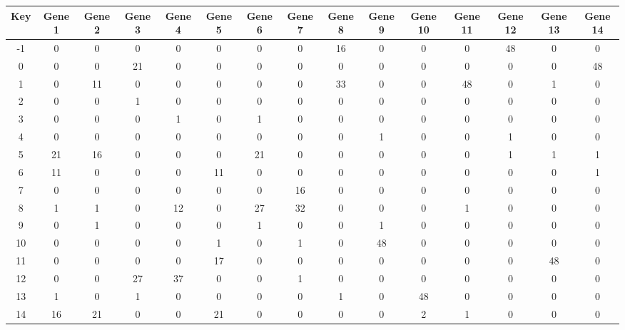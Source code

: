 \begin{tabular}{|c|c|c|c|c|c|c|c|c|c|c|c|c|c|c|}
\hline
Key & Gene 1 & Gene 2 & Gene 3 & Gene 4 & Gene 5 & Gene 6 & Gene 7 & Gene 8 & Gene 9 & Gene 10 & Gene 11 & Gene 12 & Gene 13 & Gene 14 \\
\hline
-1 & 0 & 0 & 0 & 0 & 0 & 0 & 0 & 16 & 0 & 0 & 0 & 48 & 0 & 0 \\
0 & 0 & 0 & 21 & 0 & 0 & 0 & 0 & 0 & 0 & 0 & 0 & 0 & 0 & 48 \\
1 & 0 & 11 & 0 & 0 & 0 & 0 & 0 & 33 & 0 & 0 & 48 & 0 & 1 & 0 \\
2 & 0 & 0 & 1 & 0 & 0 & 0 & 0 & 0 & 0 & 0 & 0 & 0 & 0 & 0 \\
3 & 0 & 0 & 0 & 1 & 0 & 1 & 0 & 0 & 0 & 0 & 0 & 0 & 0 & 0 \\
4 & 0 & 0 & 0 & 0 & 0 & 0 & 0 & 0 & 1 & 0 & 0 & 1 & 0 & 0 \\
5 & 21 & 16 & 0 & 0 & 0 & 21 & 0 & 0 & 0 & 0 & 0 & 1 & 1 & 1 \\
6 & 11 & 0 & 0 & 0 & 11 & 0 & 0 & 0 & 0 & 0 & 0 & 0 & 0 & 1 \\
7 & 0 & 0 & 0 & 0 & 0 & 0 & 16 & 0 & 0 & 0 & 0 & 0 & 0 & 0 \\
8 & 1 & 1 & 0 & 12 & 0 & 27 & 32 & 0 & 0 & 0 & 1 & 0 & 0 & 0 \\
9 & 0 & 1 & 0 & 0 & 0 & 1 & 0 & 0 & 1 & 0 & 0 & 0 & 0 & 0 \\
10 & 0 & 0 & 0 & 0 & 1 & 0 & 1 & 0 & 48 & 0 & 0 & 0 & 0 & 0 \\
11 & 0 & 0 & 0 & 0 & 17 & 0 & 0 & 0 & 0 & 0 & 0 & 0 & 48 & 0 \\
12 & 0 & 0 & 27 & 37 & 0 & 0 & 1 & 0 & 0 & 0 & 0 & 0 & 0 & 0 \\
13 & 1 & 0 & 1 & 0 & 0 & 0 & 0 & 1 & 0 & 48 & 0 & 0 & 0 & 0 \\
14 & 16 & 21 & 0 & 0 & 21 & 0 & 0 & 0 & 0 & 2 & 1 & 0 & 0 & 0 \\
\hline
\end{tabular}